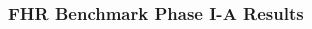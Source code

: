 \begin{frame}
    \frametitle{FHR Benchmark Phase I-A Results}
    \vspace{-0.35cm}
    \begin{columns}
        \begin{column}{0.5\textwidth}
            \begin{figure}
                \centering

\end{figure}
\end{column}
\end{columns}
\end{frame}

